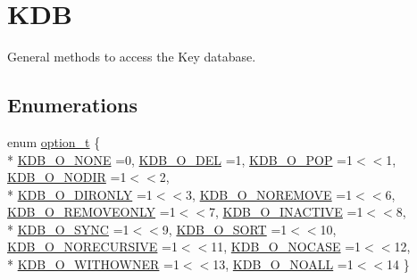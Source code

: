 \hypertarget{group__kdb}{\section{K\-D\-B}
\label{group__kdb}
}


General methods to access the Key database.  


\subsection*{Enumerations}
\begin{DoxyCompactItemize}
\item 
enum \hyperlink{group__kdb_ga98a3d6a4016c9dad9cbd1a99a9c2a45a}{option\-\_\-t} \{ \\*
\hyperlink{group__kdb_gga98a3d6a4016c9dad9cbd1a99a9c2a45aa00738455e0ae843c8720809d8287f370}{K\-D\-B\-\_\-\-O\-\_\-\-N\-O\-N\-E} =0, 
\hyperlink{group__kdb_gga98a3d6a4016c9dad9cbd1a99a9c2a45aa66a5380c120f25f28f49848c4a863ead}{K\-D\-B\-\_\-\-O\-\_\-\-D\-E\-L} =1, 
\hyperlink{group__kdb_gga98a3d6a4016c9dad9cbd1a99a9c2a45aa52fb5f2cc86773d393da62bebebf7984}{K\-D\-B\-\_\-\-O\-\_\-\-P\-O\-P} =1$<$$<$1, 
\hyperlink{group__kdb_gga98a3d6a4016c9dad9cbd1a99a9c2a45aa1a70738b2126badb8db7b012c8a1c610}{K\-D\-B\-\_\-\-O\-\_\-\-N\-O\-D\-I\-R} =1$<$$<$2, 
\\*
\hyperlink{group__kdb_gga98a3d6a4016c9dad9cbd1a99a9c2a45aa131e99d60253d0b887a1e5886f8aa96c}{K\-D\-B\-\_\-\-O\-\_\-\-D\-I\-R\-O\-N\-L\-Y} =1$<$$<$3, 
\hyperlink{group__kdb_gga98a3d6a4016c9dad9cbd1a99a9c2a45aa7649f575c2eb0adeaf2c9173ae16e0e6}{K\-D\-B\-\_\-\-O\-\_\-\-N\-O\-R\-E\-M\-O\-V\-E} =1$<$$<$6, 
\hyperlink{group__kdb_gga98a3d6a4016c9dad9cbd1a99a9c2a45aaf6ed09cee8aa8cf0d6a0e318a7105440}{K\-D\-B\-\_\-\-O\-\_\-\-R\-E\-M\-O\-V\-E\-O\-N\-L\-Y} =1$<$$<$7, 
\hyperlink{group__kdb_gga98a3d6a4016c9dad9cbd1a99a9c2a45aa789926d8a8e15b029cf7dded4154bcda}{K\-D\-B\-\_\-\-O\-\_\-\-I\-N\-A\-C\-T\-I\-V\-E} =1$<$$<$8, 
\\*
\hyperlink{group__kdb_gga98a3d6a4016c9dad9cbd1a99a9c2a45aaa7d5265eacbb1590982b718f35443e2e}{K\-D\-B\-\_\-\-O\-\_\-\-S\-Y\-N\-C} =1$<$$<$9, 
\hyperlink{group__kdb_gga98a3d6a4016c9dad9cbd1a99a9c2a45aad9d03b36ee88ca5a774cc01b190c99b8}{K\-D\-B\-\_\-\-O\-\_\-\-S\-O\-R\-T} =1$<$$<$10, 
\hyperlink{group__kdb_gga98a3d6a4016c9dad9cbd1a99a9c2a45aa6adaa17b267027ce50e670bf8cc6e824}{K\-D\-B\-\_\-\-O\-\_\-\-N\-O\-R\-E\-C\-U\-R\-S\-I\-V\-E} =1$<$$<$11, 
\hyperlink{group__kdb_gga98a3d6a4016c9dad9cbd1a99a9c2a45aaa5586d229e048f816bf7982765442b86}{K\-D\-B\-\_\-\-O\-\_\-\-N\-O\-C\-A\-S\-E} =1$<$$<$12, 
\\*
\hyperlink{group__kdb_gga98a3d6a4016c9dad9cbd1a99a9c2a45aab2ff402f5de9aa67b7f786fb715a7a31}{K\-D\-B\-\_\-\-O\-\_\-\-W\-I\-T\-H\-O\-W\-N\-E\-R} =1$<$$<$13, 
\hyperlink{group__kdb_gga98a3d6a4016c9dad9cbd1a99a9c2a45aae8dd1961707e7d0c27228a3f98b0a94d}{K\-D\-B\-\_\-\-O\-\_\-\-N\-O\-A\-L\-L} =1$<$$<$14
 \}
\end{DoxyCompactItemize}
